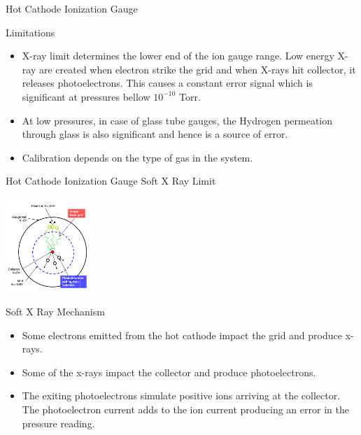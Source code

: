 \documentclass[11pt]{beamer}
\begin{document}
\begin{frame}{Hot Cathode Ionization Gauge}


\begin{block}{Limitations}
          \begin{itemize}
          
          \item X-ray limit determines the lower end of the ion gauge range. Low energy X-ray are created when electron strike the grid and when X-rays hit collector, it releases photoelectrons. This causes a constant error signal which is significant at pressures bellow $10^{-10}$ Torr.
          \item At low pressures, in case of glass tube gauges, the Hydrogen permeation through glass is also significant and hence is a source of error.
          \item Calibration depends on the type of gas in the system.
          \end{itemize}
       
       \end{block}  



\end{frame}

\begin{frame}{Hot Cathode Ionization Gauge Soft X Ray Limit}

\begin{center}
			\includegraphics[width=0.25\textwidth]{XrayMechanism.png}
		\end{center} 
		
\begin{block}{ Soft X Ray Mechanism}
          \begin{itemize}
          
          \item Some electrons emitted from the hot cathode impact the grid and produce x-rays.
		  \item Some of the x-rays impact the collector and produce photoelectrons.

			\item The exiting photoelectrons simulate positive ions arriving at the collector. The photoelectron current adds to
the ion current producing an error in the pressure reading.
		
          \end{itemize}
       
       \end{block}  



\end{frame}
\end{document}
